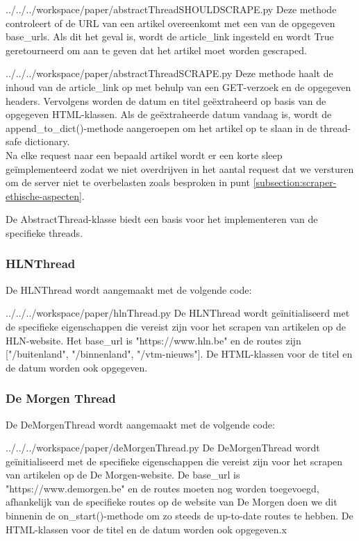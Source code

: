 \begin{pythoncode}{../../../workspace/paper/abstractThreadSHOULDSCRAPE.py}
Deze methode controleert of de URL van een artikel overeenkomt met een van de opgegeven base\_urls. Als dit het geval is, wordt de article\_link ingesteld en wordt True geretourneerd om aan te geven dat het artikel moet worden gescraped.
\end{pythoncode}

\begin{pythoncode}{../../../workspace/paper/abstractThreadSCRAPE.py}
    Deze methode haalt de inhoud van de article\_link op met behulp van een GET-verzoek en de opgegeven headers. Vervolgens worden de datum en titel geëxtraheerd op basis van de opgegeven HTML-klassen. Als de geëxtraheerde datum vandaag is, wordt de append\_to\_dict()-methode aangeroepen om het artikel op te slaan in de thread-safe dictionary. \\
    
    Na elke request naar een bepaald artikel wordt er een korte sleep geïmplementeerd zodat we niet overdrijven in het aantal request dat we versturen om de server niet te overbelasten zoals besproken in punt \ref{subsection:scraper-ethische-aspecten}.
\end{pythoncode}

De AbstractThread-klasse biedt een basis voor het implementeren van de specifieke threads.

\subsubsection{HLNThread}
    De HLNThread wordt aangemaakt met de volgende code:
    
\begin{pythoncode}{../../../workspace/paper/hlnThread.py}
    De HLNThread wordt geïnitialiseerd met de specifieke eigenschappen die vereist zijn voor het scrapen van artikelen op de HLN-website. Het base\_url is "https://www.hln.be" en de routes zijn ["/buitenland", "/binnenland", "/vtm-nieuws"]. De HTML-klassen voor de titel en de datum worden ook opgegeven.
\end{pythoncode}

\subsubsection{De Morgen Thread}
    De DeMorgenThread wordt aangemaakt met de volgende code:

\begin{pythoncode}{../../../workspace/paper/deMorgenThread.py}
    De DeMorgenThread wordt geïnitialiseerd met de specifieke eigenschappen die vereist zijn voor het scrapen van artikelen op de De Morgen-website. De base\_url is "https://www.demorgen.be" en de routes moeten nog worden toegevoegd, afhankelijk van de specifieke routes op de website van De Morgen doen we dit binnenin de on\_start()-methode om zo steeds de up-to-date routes te hebben. De HTML-klassen voor de titel en de datum worden ook opgegeven.x
\end{pythoncode}

